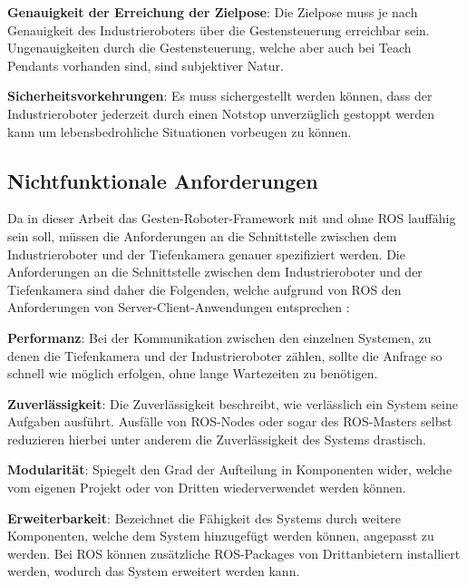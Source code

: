 \begin{compactitem}
    \item \textbf{Genauigkeit der Erreichung der Zielpose}: Die Zielpose muss je nach Genauigkeit des Industrieroboters über die Gestensteuerung erreichbar sein. Ungenauigkeiten durch die Gestensteuerung, welche aber auch bei Teach Pendants vorhanden sind, sind subjektiver Natur.
    \item \textbf{Sicherheitsvorkehrungen}: Es muss sichergestellt werden können, dass der Industrieroboter jederzeit durch einen Notstop unverzüglich gestoppt werden kann um lebensbedrohliche Situationen vorbeugen zu können.
\end{compactitem}

\subsection{Nichtfunktionale Anforderungen}
Da in dieser Arbeit das Gesten-Roboter-Framework mit und ohne ROS lauffähig sein soll, müssen die Anforderungen an die Schnittstelle zwischen dem Industrieroboter und der Tiefenkamera genauer spezifiziert werden. Die Anforderungen an die Schnittstelle zwischen dem Industrieroboter und der Tiefenkamera sind daher die Folgenden, welche aufgrund von ROS den Anforderungen von Server-Client-Anwendungen entsprechen \cite{osterrieder_komponentenmodelle_2004}:\\

\begin{compactitem}
    \item \textbf{Performanz}: Bei der Kommunikation zwischen den einzelnen Systemen, zu denen die Tiefenkamera und der Industrieroboter zählen, sollte die Anfrage so schnell wie möglich erfolgen, ohne lange Wartezeiten zu benötigen.
    \item \textbf{Zuverlässigkeit}: Die Zuverlässigkeit beschreibt, wie verlässlich ein System seine Aufgaben ausführt. Ausfälle von ROS-Nodes oder sogar des ROS-Masters selbst reduzieren hierbei unter anderem die Zuverlässigkeit des Systems drastisch.
    \item \textbf{Modularität}: Spiegelt den Grad der Aufteilung in Komponenten wider, welche vom eigenen Projekt oder von Dritten wiederverwendet werden können.
    \item \textbf{Erweiterbarkeit}: Bezeichnet die Fähigkeit des Systems durch weitere Komponenten, welche dem System hinzugefügt werden können, angepasst zu werden. Bei ROS können zusätzliche ROS-Packages von Drittanbietern installiert werden, wodurch das System erweitert werden kann.
\end{compactitem}

